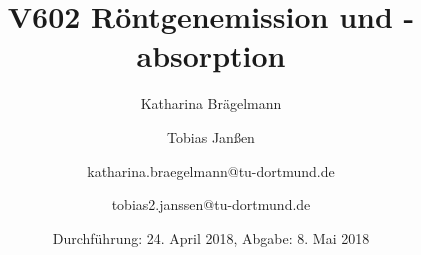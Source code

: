
\title{V602 Röntgenemission und -absorption}
\author{Katharina Brägelmann \and Tobias Janßen \and katharina.braegelmann@tu-dortmund.de \and tobias2.janssen@tu-dortmund.de}
\date{Durchführung: 24. April 2018, Abgabe: 8. Mai 2018}
\maketitle

\tableofcontents
